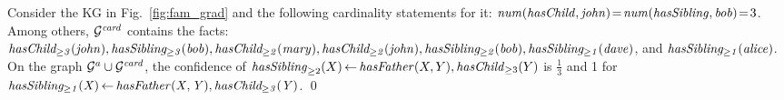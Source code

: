 \iffalse
\scriptsize
\begin{table}[t]
\begin{center}
\renewcommand*{\arraystretch}{0.95}
\begin{tabular}{|l|l|l|l|}
\hline
&  $\mi{hasBrother_{\geq 1}}$ &$\mi{hasSister_{\geq 1}}$&
$\mi{hasSibling_{\geq 2}}$\\\hline
$\mi{ann}$ & $\checkmark$ &$\checkmark$ &$\checkmark$\\ \hline
$\mi{kate}$ & $\checkmark$ &$\checkmark$ &$\checkmark$\\ \hline
$\mi{lola}$ & $\checkmark$ &$\checkmark$ &$\checkmark$\\ \hline
$\mi{john}$ & $\checkmark$ &$\checkmark$ &\\ \hline
\end{tabular}
\caption{Meta-data from Example~\ref{ex:card}}
\label{tab:inc}
\end{center}
\end{table}
\normalsize
\fi

\iffalse
\begin{figure}[t]
\begin{center}
\texttt{[image: figures/fam]}
\caption{Example KG: family}
\label{fig:fam}
\end{center}
\end{figure}
\fi


\begin{example}
Consider the KG in Fig.~\ref{fig:fam_grad}
and the following cardinality statements for it: $\mathit{num(hasChild,john)\!=\!num(hasSibling,bob)}\!=\!3$.  %
Among others, $\mathcal{G}^{\mathit{card}}$ contains the facts:
$%
\mi{hasChild_{\geq 3}(john)},
\mi{hasSibling_{\geq 3}(bob)},
\mi{hasChild_{\geq 2}(mary)},
\mi{hasChild_{\geq 2}(john)},\\ 
\mi{hasSibling_{\geq 2}(bob)},
\mi{hasSibling_{\geq 1}(dave)}$, and
$\mathit{hasSibling_{\geq 1}(alice)}$. %
On the graph $\mathcal{G}^a\cup \mathcal{G}^{\mathit{card}}$, the confidence of $\mathit{hasSibling}_{\geq 2}(X)\,{\leftarrow}\, \mathit{hasFather}(X, Y), \mathit{hasChild}_{\geq 3}(Y)$ %
is $\frac{1}{3}$ and
1 for
$\mathit{hasSibling_{\geq 1}(X)\,{\leftarrow}\, hasFather(X, Y),hasChild_{\geq 3}(Y)}$. %
\qed
\end{example}

